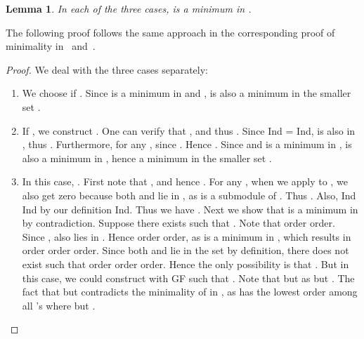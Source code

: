 \documentclass[11pt,onecolumn,draftcls]{IEEEtran}
\newtheorem{lemma}{Lemma}
\begin{document}
\begin{lemma} \label{lemma: GIminimum}
In each of the three cases,  is a minimum in .
\end{lemma}
The following proof follows the same approach in the corresponding proof of minimality in~\cite{McEliece03} and~\cite{WangMcEliece05}.
\begin{proof}
We deal with the three cases separately:
\begin{enumerate}
\item We choose  if . Since  is a minimum in  and ,  is also a minimum in the smaller set .
\item If , we construct . One can verify that , and thus . Since Ind = Ind,  is also in , thus .  Furthermore,  for any , since . Hence . Since  and  is a minimum in ,  is also a minimum in , hence a minimum in the smaller set .

\item In this case, . First note that , and hence . For any , when we apply  to , we also get zero because both  and  lie in , as  is a submodule of . Thus . Also, Ind Ind by our definition Ind. Thus we have . Next we show that  is a minimum in  by contradiction. Suppose there exists  such that . Note that order order. Since ,  also lies in . Hence order order, as  is a minimum in , which results in order order order. Since both  and  lie in the set  by definition, there does not exist  such that order order order. Hence the only possibility is that . But in this case, we could construct  with GF such that . Note that  but  as  but . The fact that  but  contradicts the minimality of  in , as  has the lowest order among all 's  where  but .
\end{enumerate}
\end{proof}
\end{document}
